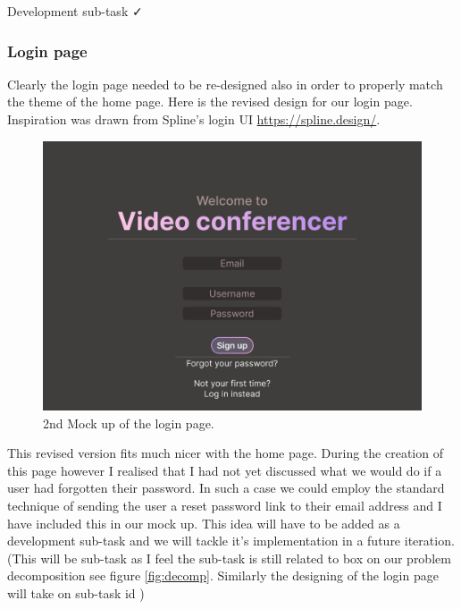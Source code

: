 {\color{gray} \hrulefill} \vspace{0.2cm}

{\sffamily Development sub-task  \faCheck}

\subsubsection{Login page}

Clearly the login page needed to be re-designed also in order
to properly match the theme of the home page. Here is the 
revised design for our login page. Inspiration was drawn 
from Spline's login UI \url{https://spline.design/}.

\begin{figure}[H]
\centering

\includegraphics[scale=0.2]{Images/Login_Page_2.png}

\caption{2nd Mock up of the login page.}
\end{figure}

This revised version fits much nicer with the home page.
During the creation of this page however I realised that I 
had not yet discussed what we would do if a user had
forgotten their password. In such a case we could employ 
the standard technique of sending the user a reset password 
link to their email address and I have included this in 
our mock up. This idea will have to be added as a development
sub-task and we will tackle it's implementation in a future 
iteration. (This will be sub-task  as I feel 
the sub-task is still related to box  on our 
problem decomposition see figure \ref{fig:decomp}. Similarly
the designing of the login page will take on sub-task id
) \\ \vspace{0.2cm}

